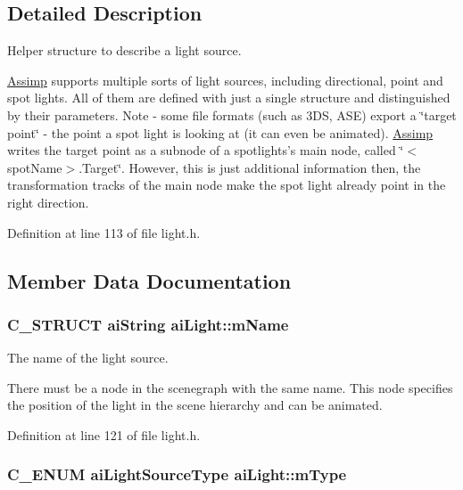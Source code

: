 \subsection{Detailed Description}
Helper structure to describe a light source.

\hyperlink{namespace_assimp}{Assimp} supports multiple sorts of light sources, including directional, point and spot lights. All of them are defined with just a single structure and distinguished by their parameters. Note - some file formats (such as 3DS, ASE) export a \char`\"{}target point\char`\"{} - the point a spot light is looking at (it can even be animated). \hyperlink{namespace_assimp}{Assimp} writes the target point as a subnode of a spotlights's main node, called \char`\"{}$<$spotName$>$.Target\char`\"{}. However, this is just additional information then, the transformation tracks of the main node make the spot light already point in the right direction. 

Definition at line 113 of file light.h.

\subsection{Member Data Documentation}
\hypertarget{structai_light_92806413f16230728b04e5f379fd00c0}{
\subsubsection[mName]{\setlength{\rightskip}{0pt plus 5cm}C\_\-STRUCT {\bf aiString} {\bf aiLight::mName}}}
\label{structai_light_92806413f16230728b04e5f379fd00c0}


The name of the light source.

There must be a node in the scenegraph with the same name. This node specifies the position of the light in the scene hierarchy and can be animated. 

Definition at line 121 of file light.h.\hypertarget{structai_light_4cba1741875dd92724ff55be91c60c2b}{
\subsubsection[mType]{\setlength{\rightskip}{0pt plus 5cm}C\_\-ENUM {\bf aiLightSourceType} {\bf aiLight::mType}}}
\label{structai_light_4cba1741875dd92724ff55be91c60c2b}



